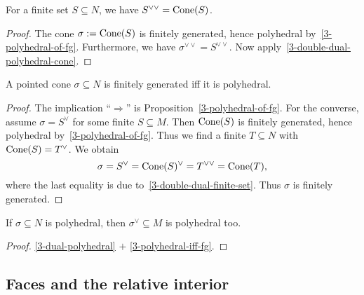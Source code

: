 \begin{proposition}
  \label{3-double-dual-finite-set}
  \uses{}
  \leanok
  For a finite set \( S \subseteq N \), we have \( S^{\vee\vee} =
  \operatorname{Cone}(S) \).
\end{proposition}
\begin{proof}
  \leanok
  The cone \( \sigma := \operatorname{Cone}(S) \) is finitely generated, hence
  polyhedral by~\ref{3-polyhedral-of-fg}. Furthermore, we have \(
  \sigma^{\vee\vee} = S^{\vee\vee} \). Now
  apply~\ref{3-double-dual-polyhedral-cone}.
\end{proof}

\begin{proposition}[Polyhedral = Finitely generated]
  \label{3-polyhedral-iff-fg}
  \uses{}
  \leanok
  A pointed cone \( \sigma \subseteq N \) is finitely generated iff it is
  polyhedral.
\end{proposition}
\begin{proof}
  \leanok
  The implication ``\( \Rightarrow \)'' is
  Proposition~\ref{3-polyhedral-of-fg}. For the converse, assume
  \( \sigma = S^{\vee} \) for some finite \( S \subseteq M \). Then \(
  \operatorname{Cone}(S) \) is finitely generated, hence polyhedral
  by~\ref{3-polyhedral-of-fg}. Thus we find a finite \( T
  \subseteq N \) with \( \operatorname{Cone}(S) = T^\vee \). We obtain
  \[
      \sigma = S^{\vee} = \operatorname{Cone}(S)^\vee = T^{\vee\vee} = \operatorname{Cone}(T),
  \]
  where the last equality is due
  to~\ref{3-double-dual-finite-set}. Thus \( \sigma \) is finitely
  generated.
\end{proof}

\begin{proposition}
  \label{3-dual-polyhedral-cone}
  \leanok
  If \( \sigma \subseteq N \) is
  polyhedral, then \( \sigma^\vee \subseteq M \) is polyhedral too.
\end{proposition}
\begin{proof}
  \leanok
  \ref{3-dual-polyhedral} \( + \) \ref{3-polyhedral-iff-fg}.
\end{proof}


\subsection{Faces and the relative interior}

